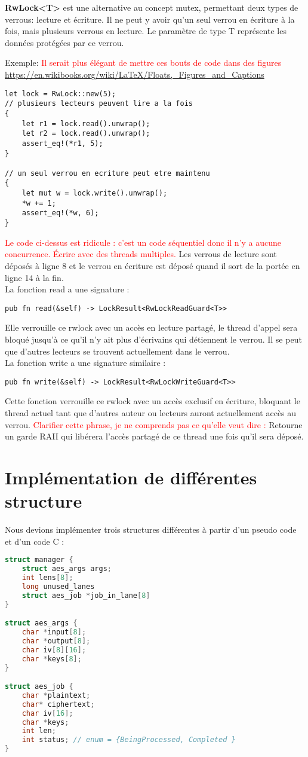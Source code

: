 \documentclass{article}
\newcommand{\TODO}[1]{\textcolor{red}{#1}}
\begin{document}
\textbf{RwLock<T>} est une alternative au concept mutex, permettant deux types de verrous: lecture et écriture. Il ne peut y avoir qu’un seul verrou en écriture à la fois, mais plusieurs verrous en lecture. Le paramètre de type T représente les données protégées par ce verrou. 

Exemple: \TODO{Il serait plus élégant de mettre ces bouts de code dans des figures \url{https://en.wikibooks.org/wiki/LaTeX/Floats,_Figures_and_Captions}}
\begin{lstlisting}
let lock = RwLock::new(5);
// plusieurs lecteurs peuvent lire a la fois
{
    let r1 = lock.read().unwrap();
    let r2 = lock.read().unwrap();
    assert_eq!(*r1, 5);
} 

// un seul verrou en ecriture peut etre maintenu
{
    let mut w = lock.write().unwrap();
    *w += 1;
    assert_eq!(*w, 6);
} 
\end{lstlisting}

\TODO{Le code ci-dessus est ridicule : c'est un code séquentiel donc il n'y a aucune concurrence. Écrire avec des threads multiples.}
Les verrous de lecture sont déposés à ligne 8 et le verrou en écriture est déposé quand il sort de la portée en ligne 14 à la fin.\\
La fonction read a une signature :
\begin{lstlisting}
pub fn read(&self) -> LockResult<RwLockReadGuard<T>>
\end{lstlisting}
Elle verrouille ce rwlock avec un accès en lecture partagé, le thread d'appel sera bloqué jusqu'à ce qu'il n'y ait plus d'écrivains qui détiennent le verrou. Il se peut que d’autres lecteurs se trouvent actuellement dans le verrou. \\
La fonction write a une signature similaire :
\begin{lstlisting}
pub fn write(&self) -> LockResult<RwLockWriteGuard<T>>
\end{lstlisting}
Cette fonction verrouille ce rwlock avec un accès exclusif en écriture, bloquant le thread actuel tant que d'autres auteur ou lecteurs auront actuellement accès au verrou.
\TODO{Clarifier cette phrase, je ne comprends pas ce qu'elle veut dire :}
Retourne un garde RAII qui libérera l'accès partagé de ce thread une fois qu'il sera déposé.


\section{Implémentation de différentes structure}
    Nous devions implémenter trois structures différentes à partir d'un pseudo code et d'un code C :
\begin{lstlisting}[language=C]
struct manager {
	struct aes_args args;
	int lens[8];
	long unused_lanes
	struct aes_job *job_in_lane[8]
}

struct aes_args {
	char *input[8];
	char *output[8];
	char iv[8][16];
	char *keys[8];
}

struct aes_job {
	char *plaintext;
	char* ciphertext;
	char iv[16];
	char *keys;
	int len;
	int status; // enum = {BeingProcessed, Completed }
}
\end{lstlisting}
\end{document}
